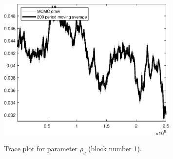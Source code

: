 \begin{figure}[H]
\centering
  \includegraphics[width=0.8\textwidth]{BRS_imp_mobility_alt/graphs/TracePlot_rho_g_blck_1}\\
    \caption{Trace plot for parameter ${\rho_g}$ (block number 1).}
\end{figure}
